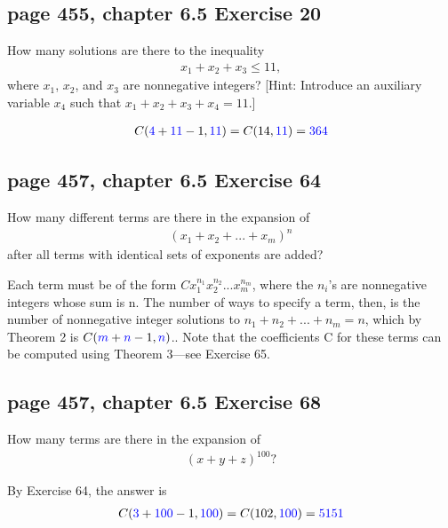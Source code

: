 \documentclass[sigconf]{acmart}
\newcommand{\answer}[2]{%
  \if\relax\detokenize{#2}\relax
    \underline{\mbox{請作答}}%
  \else
    \textcolor{blue}{#2}%
  \fi
}
\begin{document}
\subsection{page 455, chapter 6.5 Exercise 20}
\begin{shaded}
    How many solutions are there to the inequality
    \begin{eqnarray*}
        x_1 + x_2 + x_3 \le 11,
    \end{eqnarray*}
    where $x_1$, $x_2$, and $x_3$ are nonnegative integers?
    [Hint: Introduce an auxiliary variable $x_4$ such that $x_1 + x_2 + x_3 + x_4 = 11$.]
\end{shaded}
\begin{eqnarray*}
C(\answer{6.5.20a}{4} + \answer{6.5.20b}{11} - 1, \answer{6.5.20c}{11}) = C(14, \answer{6.5.20d}{11}) = \answer{6.5.20e}{364}
\end{eqnarray*}


\subsection{page 457, chapter 6.5 Exercise 64}
\begin{shaded}
    How many different terms are there in the expansion of
    \begin{eqnarray*}
        (x_1 + x_2 + ... + x_m)^n
    \end{eqnarray*}
    after all terms with identical sets of exponents are added?
\end{shaded}  
Each term must be of the form $Cx_1^{n_1} x_2^{n_2} ... x_m^{n_m}$, where the $n_i$'s are nonnegative integers whose sum is n. The number of ways to specify a term, then, is the number of nonnegative integer solutions to $n_1 +n_2 + ... +n_m = n$, which by Theorem 2 is $C(\answer{6.5.64a}{m} + \answer{6.5.64b}{n} - 1, \answer{6.5.64c}{n})$.. Note that the coefficients C for these terms can be computed using Theorem 3—see Exercise 65.


\subsection{page 457, chapter 6.5 Exercise 68}
\begin{shaded}
    How many terms are there in the expansion of
    \begin{eqnarray*}
        (x + y + z)^{100} ?
    \end{eqnarray*}
\end{shaded}
By Exercise 64, the answer is 
\begin{eqnarray*}
C(\answer{6.5.68a}{3} + \answer{6.5.68b}{100} - 1, \answer{6.5.68c}{100}) = C(102, \answer{6.5.68d}{100}) = \answer{6.5.68e}{5151}
\end{eqnarray*}

\clearpage
\end{document}
